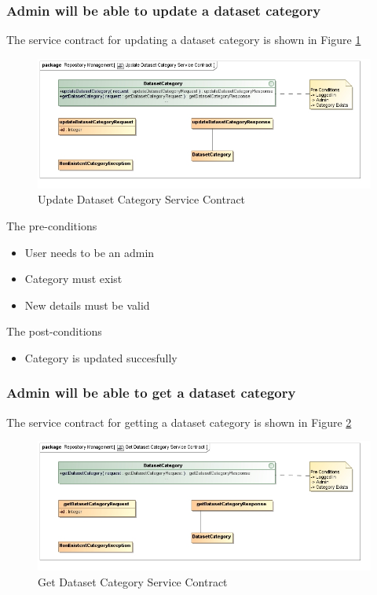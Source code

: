\subsubsection {Admin will be able to update a dataset category}

The service contract for updating a dataset category is shown in Figure \ref{fig:updateDatasetCatService}
\begin{figure}[H]
  \begin{center}
  \includegraphics[scale=0.6]{../Diagrams and Charts/Test Data/Update Dataset Category Service Contract.jpg}
  \caption{Update Dataset Category Service Contract}
  \end{center}
  \label{fig:updateDatasetCatService}
\end{figure}


The pre-conditions
\begin{itemize}
  \item User needs to be an admin
  \item Category must exist
  \item New details must be valid
\end{itemize}

The post-conditions
\begin{itemize}
  \item Category is updated succesfully
\end{itemize}
\subsubsection {Admin will be able to get a dataset category}

The service contract for getting a dataset category is shown in Figure \ref{fig:getDatasetCatService}
\begin{figure}[H]
  \begin{center}
  \includegraphics[scale=0.6]{../Diagrams and Charts/Test Data/Get Dataset Category Service Contract.jpg}
  \caption{Get Dataset Category Service Contract}
  \end{center}
  \label{fig:getDatasetCatService}
\end{figure}

